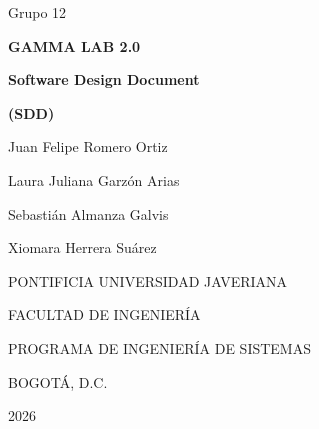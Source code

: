 \documentclass[12pt,letterpaper,oneside]{article}
\DeclareRobustCommand{\_}{\textunderscore\allowbreak}
\newcommand{\tituloProyecto}{GAMMA LAB 2.0}
\newcommand{\grupo}{Grupo 12}
\newcommand{\autorUno}{Juan Felipe Romero Ortiz}
\newcommand{\autorDos}{Laura Juliana Garzón Arias}
\newcommand{\autorTres}{Sebastián Almanza Galvis}
\newcommand{\autorCuatro}{Xiomara Herrera Suárez}
\newcommand{\universidad}{PONTIFICIA UNIVERSIDAD JAVERIANA}
\newcommand{\facultad}{FACULTAD DE INGENIERÍA}
\newcommand{\programa}{PROGRAMA DE INGENIERÍA DE SISTEMAS}
\newcommand{\ciudad}{BOGOTÁ, D.C.}
\newcommand{\anio}{2026}
\newcommand{\fechaLarga}{Noviembre, 2026}
\begin{document}
\providecommand{\tituloProyecto}{GAMMA LAB 2.0}
\providecommand{\grupo}{Grupo 12}
\providecommand{\autorUno}{Juan Felipe Romero Ortiz}
\providecommand{\autorDos}{Laura Juliana Garzón Arias}
\providecommand{\autorTres}{Sebastián Almanza Galvis}
\providecommand{\autorCuatro}{Xiomara Herrera Suárez}
\providecommand{\leyendaGrado}{MEMORIA DE PROYECTO DE GRADO REALIZADO PARA CUMPLIR UNO DE
LOS REQUISITOS PARA EL TÍTULO EN INGENIERÍA DE SISTEMAS}
\providecommand{\director}{Ing. Cécile Gauthier Umaña}
\providecommand{\juradoUno}{Ing. Nombre del Primer Jurado}
\providecommand{\juradoDos}{Ing. Nombre del Segundo Jurado}
\providecommand{\universidad}{PONTIFICIA UNIVERSIDAD JAVERIANA}
\providecommand{\universidadNombre}{Pontificia Universidad Javeriana}
\providecommand{\facultad}{FACULTAD DE INGENIERÍA}
\providecommand{\programa}{PROGRAMA DE INGENIERÍA DE SISTEMAS}
\providecommand{\ciudad}{BOGOTÁ, D.C.}
\providecommand{\anio}{2026}
\providecommand{\fechaLarga}{Noviembre, 2026}
\providecommand{\rector}{Nombre del Rector, S.J.}
\providecommand{\decano}{Ing. Nombre del Decano de la Facultad}
\providecommand{\directorDepto}{Ing. Nombre del Director de Departamento, Ph.D.}
\providecommand{\directorCarrera}{Ing. Nombre de la Directora de Carrera}

\begingroup\setlength{\parskip}{0pt}%

\thispagestyle{empty}
\begin{center}
  \vspace*{1cm}
  {\large \grupo}\par\vspace{1.2cm}
  {\LARGE\bfseries \tituloProyecto}\par\vspace{1cm}
  {\Large\bfseries Software Design Document}\par\vspace{0.3cm}
  {\large\bfseries (SDD)}\par\vspace{2cm}
  \autorUno\par
  \autorDos\par
  \autorTres\par
  \autorCuatro\par
  \vfill
  \universidad\par
  \facultad\par
  \programa\par
  \ciudad\par
  \anio\par
  \vspace{1cm}
\end{center}
\clearpage
\end{document}
